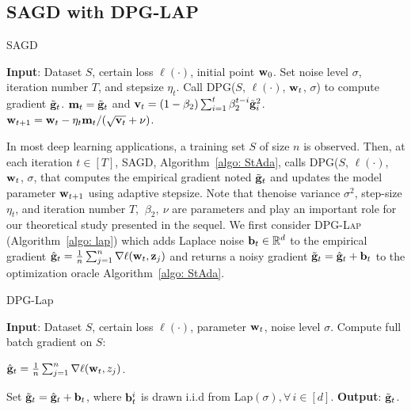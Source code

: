 \documentclass[11pt]{article}
\begin{document}
\subsection{\textsc{SAGD} with DPG-LAP} \label{subsec: SAGD_lap}
\vspace{-0.05in}
\begin{algorithm}[t] 
\caption{\textsc{SAGD}}
\begin{algorithmic}[1] \label{algo: StAda}
\STATE \textbf{Input}: Dataset $S$,  certain loss $\ell(\cdot)$, initial point $\mathbf{w}_0$.
\STATE Set  noise level $\sigma$, iteration number $T$,  and stepsize $\eta_t$.
\STATE \label{line:dpg} Call DPG($S$,  $\ell(\cdot)$, $\mathbf{w}_t$, $\sigma$) to compute gradient $\tilde {\mathbf{g}}_t$.
\STATE  \label{line:adap1}
$\mathbf{m}_t = \tilde {\mathbf{g}}_t$ and $\mathbf{v}_t = \left(1-\beta_{2}\right) \sum_{i=1}^{t} \beta_{2}^{t-i} \tilde {\mathbf{g}}_{i}^{2}$.
\STATE  \label{line:adap2} $\mathbf{w}_{t+1}=\mathbf{w}_{t}-\eta_t \mathbf{m}_t /(\sqrt{\mathbf{v}_t}+\nu)$.
\ENDFOR 
\end{algorithmic}
\end{algorithm}
In most deep learning applications, a training set $S$ of size $n$ is observed.
Then, at each iteration $t \in [T]$, \textsc{SAGD}, Algorithm~\ref{algo: StAda}, calls DPG($S$,  $\ell(\cdot)$, $\mathbf{w}_t$, $\sigma$, that computes the empirical gradient noted $\tilde {\mathbf{g}}_t$ and updates the model parameter $\mathbf{w}_{t+1}$ using adaptive stepsize.
Note that thenoise variance $\sigma^2$, step-size $\eta_t$, and iteration number $T$, $~ \beta_2,~\nu$ are parameters and play an important role for our theoretical study presented in the sequel. 
We first consider \textsc{DPG-Lap} (Algorithm~\ref{algo: lap}) which adds Laplace noise $\mathbf{b}_t \in \mathbb{R}^d$ to the empirical gradient $\hat {\mathbf{g}}_t = \frac{1}{n} \sum_{j=1}^n\nabla \ell(\mathbf{w}_t, \mathbf{z}_j)$ and returns a noisy gradient $\tilde {\mathbf{g}}_t = \hat {\mathbf{g}}_t + \mathbf{b}_t$ to the optimization oracle Algorithm~\ref{algo: StAda}. \vspace{-0.05in}
\begin{algorithm}[H]
\caption{DPG-Lap}
\begin{algorithmic}[1]
\label{algo: lap}
	\STATE \textbf{Input}: Dataset $S$,  certain loss $\ell(\cdot)$, parameter $\mathbf{w}_t$, noise level $\sigma$.
	\STATE Compute full batch gradient on $S$: \\
	\centerline{ $\hat {\mathbf{g}}_t = \frac{1}{n} \sum_{j=1}^n\nabla \ell(\mathbf{w}_t, z_j)$.}	
	\STATE Set $\tilde {\mathbf{g}}_t = \hat {\mathbf{g}}_t + \mathbf{b}_t$, where $\mathbf{b}_t^i$ is drawn i.i.d from Lap$(\sigma), \forall\, i \in [d]$.
	\STATE \textbf{Output}: $\tilde {\mathbf{g}}_t$.
	\end{algorithmic}
\end{algorithm}\vspace{-0.1in}
\end{document}
